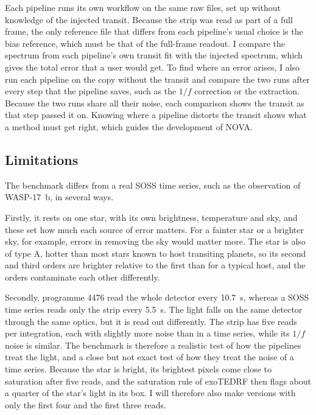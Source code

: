 Each pipeline runs its own workflow on the same raw files, set up without
knowledge of the injected transit. Because the strip was read as part of a
full frame, the only reference file that differs from each pipeline's usual
choice is the bias reference, which must be that of the full-frame readout. I
compare the spectrum from each pipeline's own transit fit with the injected
spectrum, which gives the total error that a user would get. To find where an
error arises, I also run each pipeline on the copy without the transit and
compare the two runs after every step that the pipeline saves, such as the
$1/f$ correction or the extraction. Because the two runs share all their
noise, each comparison shows the transit as that step passed it on. Knowing
where a pipeline distorts the transit shows what a method must get right,
which guides the development of NOVA.

\subsection{Limitations}
\label{sec:benchmark-limits}

The benchmark differs from a real SOSS time series, such as the observation of
WASP-17~b, in several ways.

Firstly, it rests on one star, with its own brightness, temperature and sky,
and these set how much each source of error matters. For a fainter star or a
brighter sky, for example, errors in removing the sky would matter more. The
star is also of type A, hotter than most stars known to host transiting
planets, so its second and third orders are brighter relative to the first
than for a typical host, and the orders contaminate each other differently.

Secondly, programme 4476 read the whole detector every 10.7~s, whereas a SOSS
time series reads only the strip every 5.5~s. The light falls on the same
detector through the same optics, but it is read out differently. The strip
has five reads per integration, each with slightly more noise than in a time
series, while its $1/f$ noise is similar. The benchmark is therefore a
realistic test of how the pipelines treat the light, and a close but not exact
test of how they treat the noise of a time series. Because the star is bright,
its brightest pixels come close to saturation after five reads, and the
saturation rule of exoTEDRF then flags about a quarter of the star's light in
its box. I will therefore also make versions with only the first four and the
first three reads.

